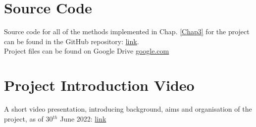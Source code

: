 \begin{appendices}
\chapter{Source Code} \label{System Requirements}
Source code for all of the methods implemented in Chap. \ref{Chap3} for the project can be found in the GitHub repository: \newline \url{link}. \newline \\
Project files can be found on Google Drive \url{google.com}

\chapter{Project Introduction Video}\label{sec:projectIntroduction}
A short video presentation, introducing background, aims and organisation of the project, as of 30$^{th}$ June 2022: \newline
\url{link}
\\
\\
\\

\end{appendices}